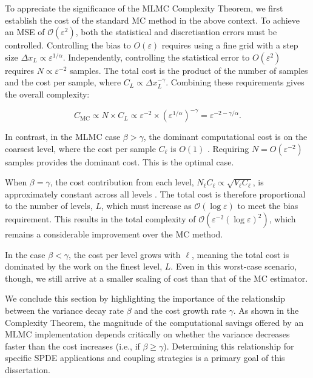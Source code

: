 To appreciate the significance of the MLMC Complexity Theorem, we first establish the cost of the 
standard MC method in the above context. To achieve an MSE of 
$\mathcal{O}(\varepsilon^2)$, both the statistical and discretisation errors must be controlled.
Controlling the bias to $O(\varepsilon)$ requires using a fine grid with a 
step size $\Delta x_L \propto \varepsilon^{1/\alpha}$. Independently, controlling the 
statistical error to $O(\varepsilon^2)$ requires 
$N \propto \varepsilon^{-2}$ samples. The total cost is the product of the number of 
samples and the cost per sample, where $C_L \propto \Delta x_L^{-\gamma}$. Combining these 
requirements gives the overall complexity:

$$
C_{\mathrm{MC}} \propto N \times C_L \propto \varepsilon^{-2} 
\times (\varepsilon^{1/\alpha})^{-\gamma} = \varepsilon^{-2-\gamma/\alpha}.
$$

In contrast, in the MLMC case $\beta > \gamma$, the dominant computational
cost is on the coarsest level, where the cost per sample $C_\ell$ is $O(1)$ 
\cite{giles2015multilevel}.
Requiring $N = O(\varepsilon^{-2})$ samples provides the dominant cost. This is the optimal 
case.

When $\beta = \gamma$, the cost contribution from each level, 
$N_\ell C_\ell \propto \sqrt{V_\ell C_\ell}$, is approximately constant across 
all levels \cite{giles2015multilevel}. The total cost is therefore proportional to the 
number of levels, $L$, which must increase as $\mathcal{O}(\log \varepsilon)$ to 
meet the bias requirement. This results in the total complexity of 
$\mathcal{O}(\varepsilon^{-2}(\log \varepsilon)^2)$, which remains a considerable 
improvement over the MC method.

In the case $\beta < \gamma$, the cost per level grows with $\ell$, meaning 
the total cost is dominated by the work on the finest level, $L$. 
Even in this worst-case scenario, though, we still arrive at a smaller scaling of cost 
than that of the MC estimator. 

We conclude this section by highlighting the importance of the relationship
between the variance decay rate $\beta$ and the cost growth rate $\gamma$. 
As shown in the Complexity Theorem, the magnitude of the computational savings 
offered by an MLMC implementation depends critically on whether the variance 
decreases faster than the cost increases (i.e., if $\beta \ge \gamma$). 
Determining this relationship for specific SPDE applications and coupling 
strategies is a primary goal of this dissertation.
